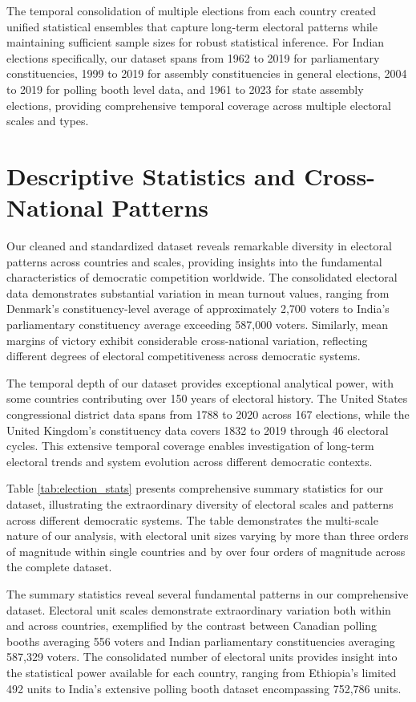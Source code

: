 The temporal consolidation of multiple elections from each country created unified statistical ensembles that capture long-term electoral patterns while maintaining sufficient sample sizes for robust statistical inference. For Indian elections specifically, our dataset spans from 1962 to 2019 for parliamentary constituencies, 1999 to 2019 for assembly constituencies in general elections, 2004 to 2019 for polling booth level data, and 1961 to 2023 for state assembly elections, providing comprehensive temporal coverage across multiple electoral scales and types.

\section{Descriptive Statistics and Cross-National Patterns}

Our cleaned and standardized dataset reveals remarkable diversity in electoral patterns across countries and scales, providing insights into the fundamental characteristics of democratic competition worldwide. The consolidated electoral data demonstrates substantial variation in mean turnout values, ranging from Denmark's constituency-level average of approximately 2,700 voters to India's parliamentary constituency average exceeding 587,000 voters. Similarly, mean margins of victory exhibit considerable cross-national variation, reflecting different degrees of electoral competitiveness across democratic systems.

The temporal depth of our dataset provides exceptional analytical power, with some countries contributing over 150 years of electoral history. The United States congressional district data spans from 1788 to 2020 across 167 elections, while the United Kingdom's constituency data covers 1832 to 2019 through 46 electoral cycles. This extensive temporal coverage enables investigation of long-term electoral trends and system evolution across different democratic contexts.

Table \ref{tab:election_stats} presents comprehensive summary statistics for our dataset, illustrating the extraordinary diversity of electoral scales and patterns across different democratic systems. The table demonstrates the multi-scale nature of our analysis, with electoral unit sizes varying by more than three orders of magnitude within single countries and by over four orders of magnitude across the complete dataset.

The summary statistics reveal several fundamental patterns in our comprehensive dataset. Electoral unit scales demonstrate extraordinary variation both within and across countries, exemplified by the contrast between Canadian polling booths averaging 556 voters and Indian parliamentary constituencies averaging 587,329 voters. The consolidated number of electoral units provides insight into the statistical power available for each country, ranging from Ethiopia's limited 492 units to India's extensive polling booth dataset encompassing 752,786 units.

